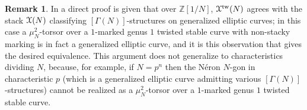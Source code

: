\documentclass[11pt]{amsart}
\theoremstyle{definition}
\newtheorem{remark}[subsection]{Remark}
\begin{document}
\begin{remark}
In \cite{P} a direct proof is given that over $\mathbb{Z}[1/N]$, ${\mathbf{\EuScript{X}}}^{\mathrm{tw}}(N)$ agrees with the stack ${\mathbf{\EuScript{X}}}(N)$ classifying $[\Gamma(N)]$-structures on generalized elliptic curves; in this case a $\mu_N^2$-torsor over a $1$-marked genus $1$ twisted stable curve with non-stacky marking is in fact a generalized elliptic curve, and it is this observation that gives the desired equivalence. This argument does not generalize to characteristics dividing $N$, because, for example, if $N = p^n$ then the N\'eron $N$-gon in characteristic $p$ (which is a generalized elliptic curve admitting various $[\Gamma(N)]$-structures) cannot be realized as a $\mu_N^2$-torsor over a $1$-marked genus $1$ twisted stable curve.
\end{remark}
\end{document}

